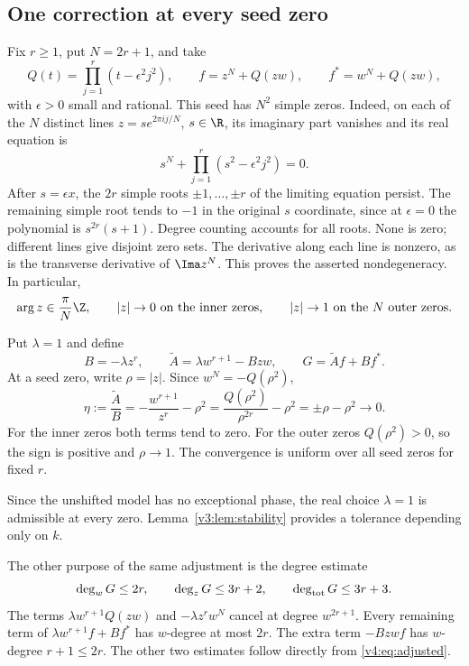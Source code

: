 \documentclass[UTF8,11pt]{ctexart}
\theoremstyle{definition}
\numberwithin{equation}{section}
\begin{document}
\subsection{One correction at every seed zero}

Fix $r\ge1$, put $N=2r+1$, and take
\begin{equation}\label{v3:eq:seed}
 Q(t)=\prod_{j=1}^r(t-\epsilon^2j^2),\qquad
 f=z^N+Q(zw),\qquad f^*=w^N+Q(zw),
\end{equation}
with $\epsilon>0$ small and rational. This seed has $N^2$ simple zeros.
Indeed, on each of the $N$ distinct lines $z=s e^{2\pi ij/N}$,
$s\in\R$, its imaginary part vanishes and its real equation is
\[
 s^N+\prod_{j=1}^r(s^2-\epsilon^2j^2)=0.
\]
After $s=\epsilon x$, the $2r$ simple roots $\pm1,\ldots,\pm r$
of the limiting equation persist. The remaining simple root tends
to $-1$ in the original $s$ coordinate, since at $\epsilon=0$ the
polynomial is $s^{2r}(s+1)$. Degree counting accounts for all roots.
None is zero; different lines give disjoint zero sets. The derivative
along each line is nonzero, as is the transverse derivative of
$\Ima z^N$. This proves the asserted nondegeneracy. In particular,
\begin{equation}\label{v3:eq:seedbounds}
 \arg z\in\frac{\pi}{N}\Z,\qquad
 |z|\to0\text{ on the inner zeros},\qquad
 |z|\to1\text{ on the }N\text{ outer zeros}.
\end{equation}

Put $\lambda=1$ and define
\begin{equation}\label{v4:eq:adjusted}
 B=-\lambda z^r,\qquad
 \widetilde A=\lambda w^{r+1}-Bzw,\qquad
 G=\widetilde A f+Bf^*.
\end{equation}
At a seed zero, write $\rho=|z|$. Since $w^N=-Q(\rho^2)$,
\begin{equation}\label{v4:eq:smallshear}
 \eta:=\frac{\widetilde A}{B}
     =-\frac{w^{r+1}}{z^r}-\rho^2
     =\frac{Q(\rho^2)}{\rho^{2r}}-\rho^2
     =\pm\rho-\rho^2\longrightarrow0.
\end{equation}
For the inner zeros both terms tend to zero. For the outer zeros
$Q(\rho^2)>0$, so the sign is positive and $\rho\to1$.
The convergence is uniform over all seed zeros for fixed $r$.

Since the unshifted model has no exceptional phase, the real choice
$\lambda=1$ is admissible at every zero. Lemma~\ref{v3:lem:stability}
provides a tolerance depending only on $k$.

The other purpose of the same adjustment is the degree estimate
\begin{equation}\label{v4:eq:Gdegrees}
 \deg_wG\le2r,\qquad \deg_zG\le3r+2,\qquad
 \deg_{\rm tot}G\le3r+3.
\end{equation}
The terms $\lambda w^{r+1}Q(zw)$ and $-\lambda z^rw^N$
cancel at degree $w^{2r+1}$. Every remaining term of
$\lambda w^{r+1}f+Bf^*$ has $w$-degree at most $2r$.
The extra term $-Bzwf$ has $w$-degree $r+1\le2r$.
The other two estimates follow directly from \eqref{v4:eq:adjusted}.
\end{document}
